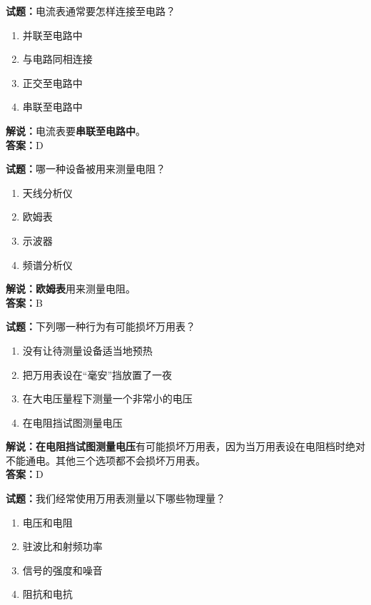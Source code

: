\documentclass{ctexbook}
\begin{document}
\noindent\textbf{试题：}电流表通常要怎样连接至电路？

\begin{enumerate}[leftmargin=3em]
	\item 并联至电路中
	\item 与电路同相连接
	\item 正交至电路中
	\item 串联至电路中
\end{enumerate}

\noindent\textbf{解说：}电流表要\textbf{串联至电路中}。\\\noindent\textbf{答案：}D


\bigskip


\noindent\textbf{试题：}哪一种设备被用来测量电阻？

\begin{enumerate}[leftmargin=3em]
	\item 天线分析仪
	\item 欧姆表
	\item 示波器
	\item 频谱分析仪
\end{enumerate}

\noindent\textbf{解说：欧姆表}用来测量电阻。\\\noindent\textbf{答案：}B


\bigskip


\noindent\textbf{试题：}下列哪一种行为有可能损坏万用表？

\begin{enumerate}[leftmargin=3em]
	\item 没有让待测量设备适当地预热
	\item 把万用表设在“毫安”挡放置了一夜
	\item 在大电压量程下测量一个非常小的电压
	\item 在电阻挡试图测量电压
\end{enumerate}

\noindent\textbf{解说：在电阻挡试图测量电压}有可能损坏万用表，因为当万用表设在电阻档时绝对不能通电。其他三个选项都不会损坏万用表。\\\noindent\textbf{答案：}D


\bigskip


\noindent\textbf{试题：}我们经常使用万用表测量以下哪些物理量？

\begin{enumerate}[leftmargin=3em]
	\item 电压和电阻
	\item 驻波比和射频功率
	\item 信号的强度和噪音
	\item 阻抗和电抗
\end{enumerate}
\end{document}
